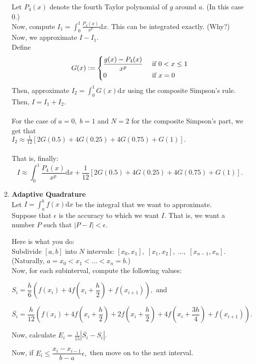 \documentclass[12pt]{article}
\theoremstyle{definition}
\begin{document}
\begin{enumerate}
	Let $P_4(x)$ denote the fourth Taylor polynomial of $g$ around $a.$ (In this case $0$.)\\
	Now, compute $I_1 = \displaystyle\int_{0}^{1} \frac{P_4(x)}{x^p} {\mathrm d}x.$ This can be integrated exactly. \hfill (Why?)\\
	Now, we approximate $I - I_1.$\\
	Define
	\[G(x) \vcentcolon= \begin{cases}
		\dfrac{g(x) - P_4(x)}{x^p} & \text{ if } 0 < x \le 1\\
		0 & \text{ if } x = 0
	\end{cases}
	\]
	Then, approximate $I_2 = \displaystyle\int_{0}^{1} G(x) {\mathrm d}x$ using the composite Simpson's rule.\\
	Then, $I = I_1 + I_2.$\\~\\
	For the case of $a = 0,\; b = 1$ and $N = 2$ for the composite Simpson's part, we get that \\
	$I_2 \approx \frac{1}{12}[2G(0.5) + 4G(0.25) + 4G(0.75) + G(1)].$\\~\\
	That is, finally:
	\[I \approx \int_{0}^{1} \frac{P_4(x)}{x^p} {\mathrm d}x + \frac{1}{12}[2G(0.5) + 4G(0.25) + 4G(0.75) + G(1)].\]
	\item \textbf{Adaptive Quadrature}\\
	Let $I = \displaystyle\int_{a}^{b} f(x) {\mathrm d}x$ be the integral that we want to approximate.\\
	Suppose that $\epsilon$ is the accuracy to which we want $I.$ That is, we want a number $P$ such that $|P - I| < \epsilon.$

	Here is what you do:\\
	Subdivide $[a, b]$ into $N$ intervals: $[x_0, x_1],\;[x_1, x_2],\;\ldots,\;[x_{n-1}, x_n].$ \\
	(Naturally, $a = x_0 < x_1 < \ldots < x_n = b$.)\\
	Now, for each subinterval, compute the following values:

	$S_i = \dfrac{h}{6}\left(f(x_i) + 4f\left(x_i + \dfrac{h}{2}\right) + f\left(x_{i+1}\right)\right),$ and

	$\overline{S_i} = \dfrac{h}{12}\left(f(x_i) + 4f\left(x_i + \dfrac{h}{2}\right) + 2f\left(x_i + \dfrac{h}{2}\right) + 4f\left(x_i + \dfrac{3h}{4}\right) + f(x_{i+1})\right).$

	Now, calculate $E_i = \frac{1}{15}|\overline{S_i} - S_i|.$

	Now, if $E_i \le \dfrac{x_{i} - x_{i-1}}{b - a}\epsilon,$ then move on to the next interval.


\end{enumerate}
\end{document}
